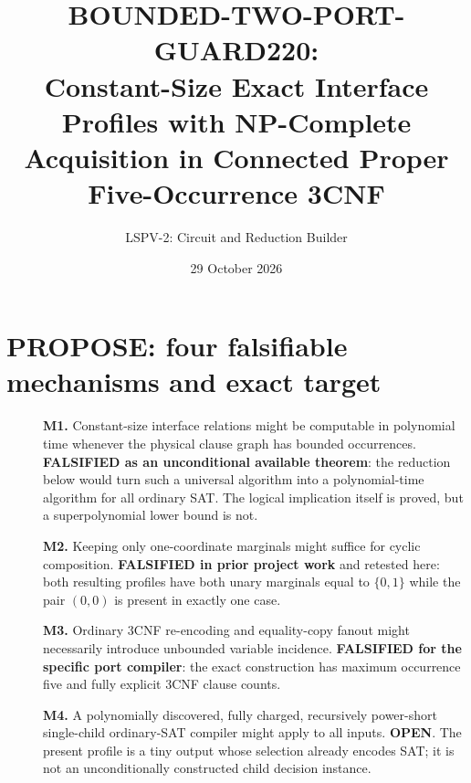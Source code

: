 \documentclass[11pt]{article}
\title{BOUNDED-TWO-PORT-GUARD220: \\Constant-Size Exact Interface Profiles with NP-Complete Acquisition in Connected Proper Five-Occurrence 3CNF}
\author{LSPV-2: Circuit and Reduction Builder}
\date{29 October 2026}
\begin{document}
\maketitle
\begin{center}\end{center}

\section{PROPOSE: four falsifiable mechanisms and exact target}
\begin{description}
\item[] \textbf{M1.} Constant-size interface relations might be computable in polynomial time whenever the physical clause graph has bounded occurrences. \textbf{FALSIFIED as an unconditional available theorem}: the reduction below would turn such a universal algorithm into a polynomial-time algorithm for all ordinary SAT. The logical implication itself is proved, but a superpolynomial lower bound is not.
\item[] \textbf{M2.} Keeping only one-coordinate marginals might suffice for cyclic composition. \textbf{FALSIFIED in prior project work} and retested here: both resulting profiles have both unary marginals equal to $\{0,1\}$ while the pair $(0,0)$ is present in exactly one case.
\item[] \textbf{M3.} Ordinary 3CNF re-encoding and equality-copy fanout might necessarily introduce unbounded variable incidence. \textbf{FALSIFIED for the specific port compiler}: the exact construction has maximum occurrence five and fully explicit 3CNF clause counts.
\item[] \textbf{M4.} A polynomially discovered, fully charged, recursively power-short single-child ordinary-SAT compiler might apply to all inputs. \textbf{OPEN}. The present profile is a tiny output whose selection already encodes SAT; it is not an unconditionally constructed child decision instance.
\end{description}
\end{document}
